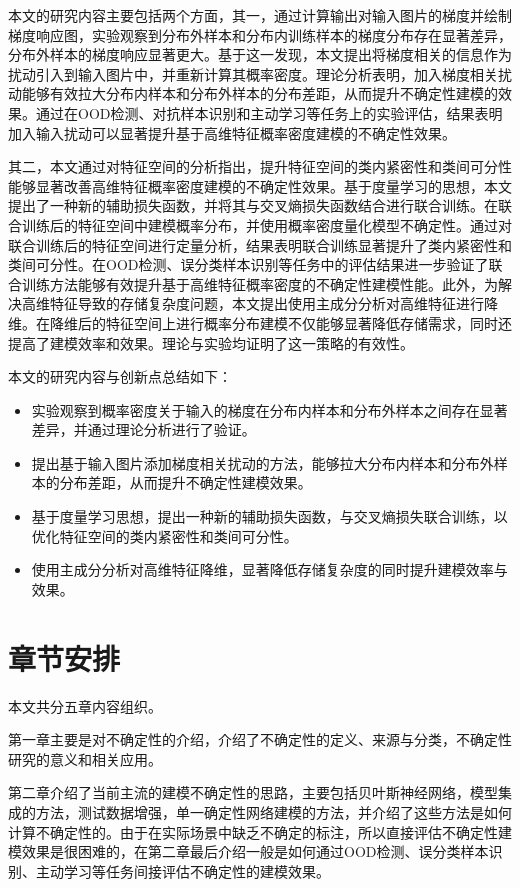 本文的研究内容主要包括两个方面，其一，通过计算输出对输入图片的梯度并绘制梯度响应图，实验观察到分布外样本和分布内训练样本的梯度分布存在显著差异，分布外样本的梯度响应显著更大。基于这一发现，本文提出将梯度相关的信息作为扰动引入到输入图片中，并重新计算其概率密度。理论分析表明，加入梯度相关扰动能够有效拉大分布内样本和分布外样本的分布差距，从而提升不确定性建模的效果。通过在OOD检测、对抗样本识别和主动学习等任务上的实验评估，结果表明加入输入扰动可以显著提升基于高维特征概率密度建模的不确定性效果。

其二，本文通过对特征空间的分析指出，提升特征空间的类内紧密性和类间可分性能够显著改善高维特征概率密度建模的不确定性效果。基于度量学习的思想，本文提出了一种新的辅助损失函数，并将其与交叉熵损失函数结合进行联合训练。在联合训练后的特征空间中建模概率分布，并使用概率密度量化模型不确定性。通过对联合训练后的特征空间进行定量分析，结果表明联合训练显著提升了类内紧密性和类间可分性。在OOD检测、误分类样本识别等任务中的评估结果进一步验证了联合训练方法能够有效提升基于高维特征概率密度的不确定性建模性能。此外，为解决高维特征导致的存储复杂度问题，本文提出使用主成分分析对高维特征进行降维。在降维后的特征空间上进行概率分布建模不仅能够显著降低存储需求，同时还提高了建模效率和效果。理论与实验均证明了这一策略的有效性。


本文的研究内容与创新点总结如下：
\begin{itemize}
    \item 实验观察到概率密度关于输入的梯度在分布内样本和分布外样本之间存在显著差异，并通过理论分析进行了验证。
    \item 提出基于输入图片添加梯度相关扰动的方法，能够拉大分布内样本和分布外样本的分布差距，从而提升不确定性建模效果。
    \item 基于度量学习思想，提出一种新的辅助损失函数，与交叉熵损失联合训练，以优化特征空间的类内紧密性和类间可分性。
    \item 使用主成分分析对高维特征降维，显著降低存储复杂度的同时提升建模效率与效果。
\end{itemize}



\section{章节安排}
本文共分五章内容组织。

第一章主要是对不确定性的介绍，介绍了不确定性的定义、来源与分类，不确定性研究的意义和相关应用。

第二章介绍了当前主流的建模不确定性的思路，主要包括贝叶斯神经网络，模型集成的方法，测试数据增强，单一确定性网络建模的方法，并介绍了这些方法是如何计算不确定性的。由于在实际场景中缺乏不确定的标注，所以直接评估不确定性建模效果是很困难的，在第二章最后介绍一般是如何通过OOD检测、误分类样本识别、主动学习等任务间接评估不确定性的建模效果。

